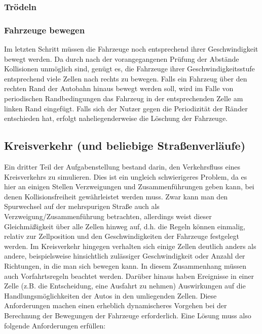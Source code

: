 \documentclass[11pt, a4paper]{article}
\begin{document}
\subsubsection{Trödeln}
\label{subsubsec:troedeln}

\subsubsection{Fahrzeuge bewegen}
\label{subsubsec:fahrzeugeBewegen}

Im letzten Schritt müssen die Fahrzeuge noch entsprechend ihrer Geschwindigkeit bewegt werden. Da durch nach der vorangegangenen Prüfung der Abstände Kollisionen unmöglich sind, genügt es, die Fahrzeuge ihrer Geschwindigkeitsstufe entsprechend viele Zellen nach rechts zu bewegen. Falls ein Fahrzeug über den rechten Rand der Autobahn hinaus bewegt werden soll, wird im Falle von periodischen Randbedingungen das Fahrzeug in der entsprechenden Zelle am linken Rand eingefügt. Falls sich der Nutzer gegen die Periodizität der Ränder entschieden hat, erfolgt naheliegenderweise die Löschung der Fahrzeuge. 

\subsection{Kreisverkehr (und beliebige Straßenverläufe)}
\label{subsec:umsetzung-kreisverkehr}

Ein dritter Teil der Aufgabenstellung bestand darin, den Verkehrsfluss eines Kreisverkehrs zu simulieren. Dies ist ein ungleich schwierigeres Problem, da es hier an einigen Stellen Verzweigungen und Zusammenführungen geben kann, bei denen Kollisionsfreiheit gewährleistet werden muss. Zwar kann man den Spurwechsel auf der mehrspurigen Straße auch als Verzweigung/Zusammenführung betrachten, allerdings weist dieser Gleichmäßigkeit über alle Zellen hinweg auf, d.h. die Regeln können einmalig, relativ zur Zellposition und den Geschwindigkeiten der Fahrzeuge festgelegt werden. Im Kreisverkehr hingegen verhalten sich einige Zellen deutlich anders als andere, beispielsweise hinsichtlich zulässiger Geschwindigkeit oder Anzahl der Richtungen, in die man sich bewegen kann. In diesem Zusammenhang müssen auch Vorfahrtsregeln beachtet werden. Darüber hinaus haben Ereignisse in einer Zelle (z.B. die Entscheidung, eine Ausfahrt zu nehmen) Auswirkungen auf die Handlungsmöglichkeiten der Autos in den umliegenden Zellen. Diese Anforderungen machen einen erheblich dynamischeres Vorgehen bei der Berechnung der Bewegungen der Fahrzeuge erforderlich. Eine Lösung muss also folgende Anforderungen erfüllen:
\end{document}
